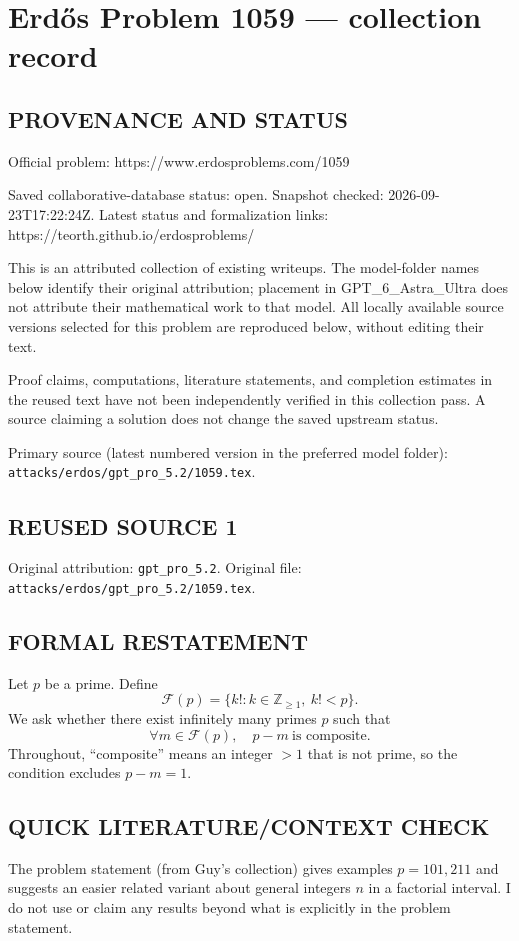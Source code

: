 \section*{Erd\H{o}s Problem 1059 --- collection record}

\subsection*{PROVENANCE AND STATUS}
Official problem: https://www.erdosproblems.com/1059

Saved collaborative-database status: open.
Snapshot checked: 2026-09-23T17:22:24Z.
Latest status and formalization links: https://teorth.github.io/erdosproblems/

This is an attributed collection of existing writeups. The model-folder names below identify their original attribution; placement in GPT\_6\_Astra\_Ultra does not attribute their mathematical work to that model. All locally available source versions selected for this problem are reproduced below, without editing their text.

Proof claims, computations, literature statements, and completion estimates in the reused text have not been independently verified in this collection pass. A source claiming a solution does not change the saved upstream status.

Primary source (latest numbered version in the preferred model folder): \texttt{attacks/erdos/gpt\_pro\_5.2/1059.tex}.

\subsection*{REUSED SOURCE 1}
Original attribution: \texttt{gpt\_pro\_5.2}.
Original file: \texttt{attacks/erdos/gpt\_pro\_5.2/1059.tex}.


\subsection*{FORMAL RESTATEMENT}
Let $p$ be a prime. Define
\[
\mathcal F(p)=\{k! : k\in\mathbb Z_{\ge 1},\ k!<p\}.
\]
We ask whether there exist infinitely many primes $p$ such that
\[
\forall m\in\mathcal F(p),\quad p-m\ \text{is composite}.
\]
Throughout, ``composite'' means an integer $>1$ that is not prime, so the condition excludes $p-m=1$.

\subsection*{QUICK LITERATURE/CONTEXT CHECK}
The problem statement (from Guy's collection) gives examples $p=101,211$ and suggests an easier related variant about general integers $n$ in a factorial interval. I do not use or claim any results beyond what is explicitly in the problem statement.

